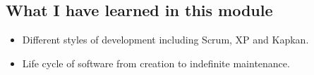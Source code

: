 

\subsection{What I have learned in this module}
\begin{itemize}
	\item Different styles of development including Scrum, XP and Kapkan.
	\item Life cycle of software from creation to indefinite maintenance.
\end{itemize}
